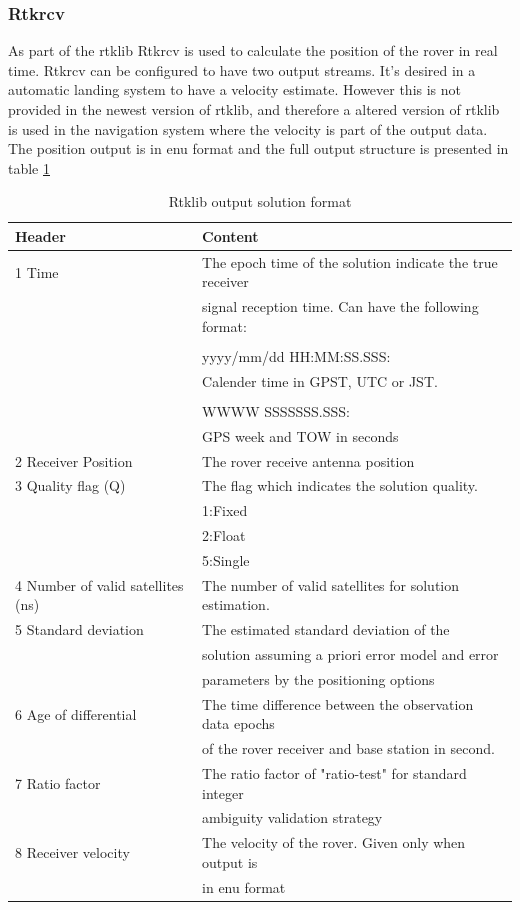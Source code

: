 \subsubsection{Rtkrcv}
As part of the \gls{rtklib} Rtkrcv is  used to calculate the position of the rover in real time. Rtkrcv can be configured to have two output streams. It's desired in a automatic landing system to have a velocity estimate. However this is not provided in the newest version of \gls{rtklib}, and therefore a altered version of \gls{rtklib} is used in the navigation system where the velocity is part of the output data. The position output is in \gls{enu} format and the full output structure is presented in table \ref{Tb:RtklibOutput}
\begin{table}[H]
\begin{center}
    \begin{tabular}{ | l | l |}
    \hline
    \textbf{Header} & \textbf{Content} \\ \hline
     1 Time & The epoch time of the solution indicate the true receiver\\& signal reception time. Can have the following format:\\&\\& yyyy/mm/dd HH:MM:SS.SSS:\\& Calender time in GPST, UTC or JST.\\&\\&
     
     WWWW SSSSSSS.SSS:\\&
     GPS week and TOW in seconds  \\ \hline
     2 Receiver Position & The rover receive antenna position \\ \hline
     3 Quality flag (Q) & The flag which indicates the solution quality.\\& 1:Fixed\\& 2:Float\\& 5:Single \\ \hline
     4 Number of valid satellites (ns) & The number of valid satellites for solution estimation. \\ \hline
     5 Standard deviation & The estimated standard deviation of the\\& solution assuming a priori error model and error\\& parameters by the positioning options \\ \hline
     6 Age of differential & The time difference between the observation data epochs\\& of the rover receiver and base station in second. \\ \hline
     7 Ratio factor & The ratio factor of "ratio-test" for standard integer\\& ambiguity validation strategy \\ \hline
     8 Receiver velocity & The velocity of the rover. Given only when output is\\& in enu format \\ \hline
    \end{tabular}
\end{center}
\caption{Rtklib output solution format }
\label{Tb:RtklibOutput}
\end{table}
